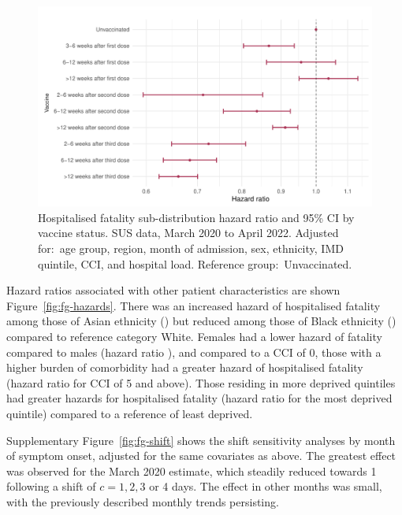 \begin{figure}[htbp!]
    \centering
    \includegraphics[width=\textwidth]{fg_vaccine.pdf}
    \caption[Hospitalised fatality sub-distribution hazard ratio by vaccine status in SUS data, March 2020 to April 2022]{Hospitalised fatality sub-distribution hazard ratio and 95\% CI by vaccine status. SUS data, March 2020 to April 2022. Adjusted for:\ age group, region, month of admission, sex, ethnicity, IMD quintile, CCI, and hospital load. Reference group:\ Unvaccinated.}\label{fig:fg-vaccine}
\end{figure}

Hazard ratios associated with other patient characteristics are shown Figure~\ref{fig:fg-hazards}. There was an increased hazard of hospitalised fatality among those of Asian ethnicity () but reduced among those of Black ethnicity () compared to reference category White. Females had a lower hazard of fatality compared to males (hazard ratio ), and compared to a CCI of 0, those with a higher burden of comorbidity had a greater hazard of hospitalised fatality (hazard ratio  for CCI of 5 and above). Those residing in more deprived quintiles had greater hazards for hospitalised fatality (hazard ratio  for the most deprived quintile) compared to a reference of least deprived.

Supplementary Figure~\ref{fig:fg-shift} shows the shift sensitivity analyses by month of symptom onset, adjusted for the same covariates as above. The greatest effect was observed for the March 2020 estimate, which steadily reduced towards 1 following a shift of $c = 1, 2, 3$ or 4 days. The effect in other months was small, with the previously described monthly trends persisting.

